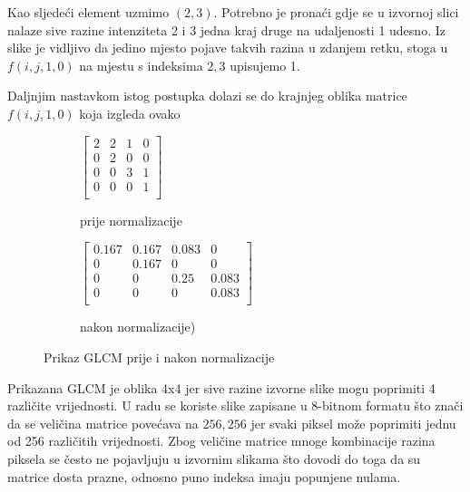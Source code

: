 \documentclass[times, utf8, zavrsni, numeric]{fer}
\begin{document}
\bigbreak

Kao sljedeći element uzmimo \((2,3)\).
Potrebno je pronaći gdje se u izvornoj slici nalaze sive razine intenziteta
2 i 3 jedna kraj druge na udaljenosti 1 udesno. Iz slike je vidljivo da 
jedino mjesto pojave takvih razina u zdanjem retku, stoga u \(f(i,j,1,0)\)
na mjestu s indeksima \(2,3\) upisujemo 1. 

\bigbreak

Daljnjim nastavkom istog postupka
dolazi se do krajnjeg oblika matrice \(f(i,j,1,0)\) koja izgleda ovako

\bigbreak

\begin{figure}[ht]
	\begin{subfigure}[b]{0.49\linewidth}
		\begin{minipage}[b]{\textwidth}
			\centering
			\small
			\(
			\begin{bmatrix}
			2&2&1&0\\
			0&2&0&0\\
			0&0&3&1\\
			0&0&0&1\\
			\end{bmatrix}
			\)
			\caption{prije normalizacije}\label{first}
		\end{minipage}\hfill
	\end{subfigure}
	\begin{subfigure}[b]{0.49\linewidth}
		\begin{minipage}[b]{\textwidth}
			\centering
			\small
			\(
			\begin{bmatrix}
			0.167&0.167&0.083&0\\
			0&0.167&0&0\\
			0&0&0.25&0.083\\
			0&0&0&0.083\\
			\end{bmatrix}
			\)
			\caption{nakon normalizacije)}\label{first}
		\end{minipage}\hfill
	\end{subfigure}
\caption{Prikaz GLCM prije i nakon normalizacije}
\end{figure}

\bigbreak

Prikazana GLCM je oblika 4x4 jer sive razine izvorne slike mogu poprimiti
4 različite vrijednosti. U radu se koriste slike zapisane u 8-bitnom formatu
što znači da se veličina matrice povećava na \(256,256\) jer svaki piksel može
poprimiti jednu od 256 različitih vrijednosti. Zbog veličine matrice mnoge
kombinacije razina piksela se često ne pojavljuju u izvornim slikama što
dovodi do toga da su matrice dosta prazne, odnosno puno indeksa imaju popunjene 
nulama.
\end{document}
